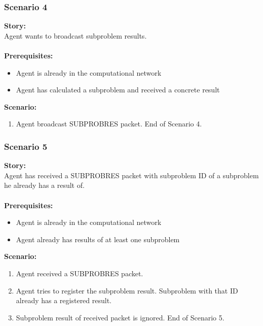 \documentclass{article}
\begin{document}
\subsubsection{Scenario 4}
\noindent\textbf{Story:} \\
Agent wants to broadcast subproblem results. \\\\
\textbf{Prerequisites:}
\begin{itemize}
    \item Agent is already in the computational network
    \item Agent has calculated a subproblem and received a concrete result
\end{itemize}
\textbf{Scenario:}
\begin{enumerate}
    \item Agent broadcast SUBPROBRES packet. End of Scenario 4.
\end{enumerate}

\subsubsection{Scenario 5}
\noindent\textbf{Story:} \\
Agent has received a SUBPROBRES packet with subproblem ID of a subproblem he already has a result of. \\\\
\textbf{Prerequisites:}
\begin{itemize}
    \item Agent is already in the computational network
    \item Agent already has results of at least one subproblem
\end{itemize}
\textbf{Scenario:}
\begin{enumerate}
    \item Agent received a SUBPROBRES packet.
    \item Agent tries to register the subproblem result. Subproblem with that ID already has a registered result.
    \item Subproblem result of received packet is ignored. End of Scenario 5.
\end{enumerate}
\end{document}

